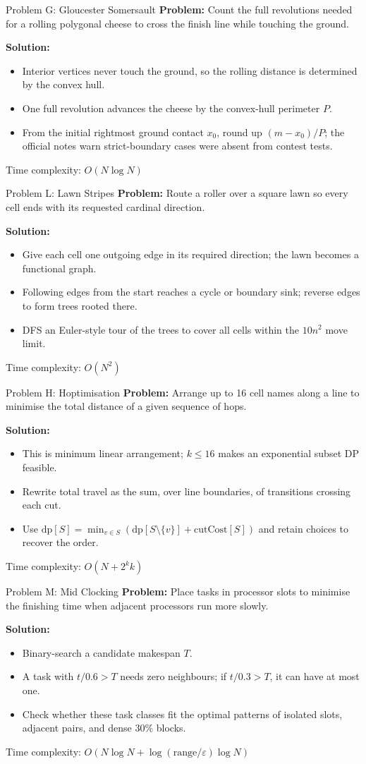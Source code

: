 \documentclass{beamer}
\newcommand{\problemframe}[5]{%
    \begin{frame}{Problem #1: #2}
        \textbf{Problem:} #3\par
        \vspace{0.5em}
        \textbf{Solution:}
        \begin{itemize}
            \setlength{\itemsep}{0.25em}
            #4
        \end{itemize}
        \vfill
        {\small\textcolor{kcpc-muted}{Time complexity: #5}\par}
    \end{frame}
}
\begin{document}
\problemframe{G}{Gloucester Somersault}
    {Count the full revolutions needed for a rolling polygonal cheese to cross the finish line while touching the ground.}
    {\item<1-> Interior vertices never touch the ground, so the rolling distance is determined by the convex hull.
     \item<1-> One full revolution advances the cheese by the convex-hull perimeter $P$.
     \item<1-> From the initial rightmost ground contact $x_0$, round up $(m-x_0)/P$; the official notes warn strict-boundary cases were absent from contest tests.}
    {$O(N\log N)$}

\problemframe{L}{Lawn Stripes}
    {Route a roller over a square lawn so every cell ends with its requested cardinal direction.}
    {\item<1-> Give each cell one outgoing edge in its required direction; the lawn becomes a functional graph.
     \item<1-> Following edges from the start reaches a cycle or boundary sink; reverse edges to form trees rooted there.
     \item<1-> DFS an Euler-style tour of the trees to cover all cells within the $10n^2$ move limit.}
    {$O(N^2)$}

\problemframe{H}{Hoptimisation}
    {Arrange up to 16 cell names along a line to minimise the total distance of a given sequence of hops.}
    {\item<1-> This is minimum linear arrangement; $k\le16$ makes an exponential subset DP feasible.
     \item<1-> Rewrite total travel as the sum, over line boundaries, of transitions crossing each cut.
     \item<1-> Use $\mathrm{dp}[S]=\min_{v\in S}(\mathrm{dp}[S\setminus\{v\}]+\mathrm{cutCost}[S])$ and retain choices to recover the order.}
    {$O(N+2^k k)$}

\problemframe{M}{Mid Clocking}
    {Place tasks in processor slots to minimise the finishing time when adjacent processors run more slowly.}
    {\item<1-> Binary-search a candidate makespan $T$.
     \item<1-> A task with $t/0.6>T$ needs zero neighbours; if $t/0.3>T$, it can have at most one.
     \item<1-> Check whether these task classes fit the optimal patterns of isolated slots, adjacent pairs, and dense $30\%$ blocks.}
    {$O(N\log N+\log(\text{range}/\varepsilon)\log N)$}
\end{document}
